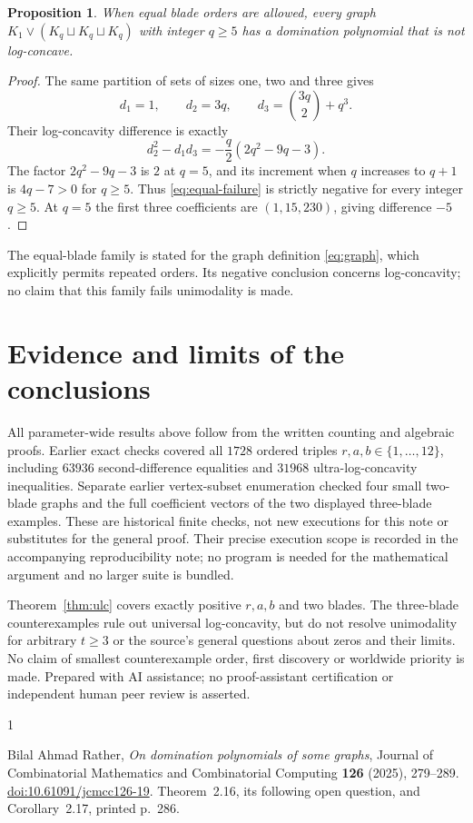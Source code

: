 \documentclass[11pt,a4paper]{article}
\newtheorem{proposition}{Proposition}
\begin{document}
\begin{proposition}\label{prop:equal}
When equal blade orders are allowed, every graph
$K_1\vee(K_q\sqcup K_q\sqcup K_q)$ with integer $q\ge5$ has a
domination polynomial that is not log-concave.
\end{proposition}
\begin{proof}
The same partition of sets of sizes one, two and three gives
\[
 d_1=1,\qquad d_2=3q,\qquad d_3=\binom{3q}{2}+q^3.
\]
Their log-concavity difference is exactly
\begin{equation}\label{eq:equal-failure}
 d_2^2-d_1d_3=-\frac q2(2q^2-9q-3).
\end{equation}
The factor $2q^2-9q-3$ is $2$ at $q=5$, and its increment when
$q$ increases to $q+1$ is $4q-7>0$ for $q\ge5$.
Thus \eqref{eq:equal-failure} is strictly negative for every
integer $q\ge5$. At $q=5$ the first three coefficients are
$(1,15,230)$, giving difference $-5$.
\end{proof}

The equal-blade family is stated for the graph definition
\eqref{eq:graph}, which explicitly permits repeated orders. Its
negative conclusion concerns log-concavity; no claim that this
family fails unimodality is made.

\section{Evidence and limits of the conclusions}
All parameter-wide results above follow from the written counting
and algebraic proofs. Earlier exact checks covered all $1728$
ordered triples $r,a,b\in\{1,\ldots,12\}$, including $63936$
second-difference equalities and $31968$ ultra-log-concavity
inequalities. Separate earlier vertex-subset enumeration checked
four small two-blade graphs and the full coefficient vectors of
the two displayed three-blade examples. These are historical
finite checks, not new executions for this note or substitutes
for the general proof. Their precise execution scope is recorded
in the accompanying reproducibility note; no program is needed
for the mathematical argument and no larger suite is bundled.

Theorem~\ref{thm:ulc} covers exactly positive $r,a,b$ and two blades.
The three-blade counterexamples rule out universal log-concavity,
but do not resolve unimodality for arbitrary $t\ge3$ or the
source's general questions about zeros and their limits. No claim
of smallest counterexample order, first discovery or worldwide
priority is made. Prepared with AI assistance; no proof-assistant
certification or independent human peer review is asserted.

\begin{thebibliography}{1}
\raggedright
{}
Bilal Ahmad Rather, \emph{On domination polynomials of some graphs},
Journal of Combinatorial Mathematics and Combinatorial Computing
\textbf{126} (2025), 279--289.
\href{https://doi.org/10.61091/jcmcc126-19}{doi:10.61091/jcmcc126-19}.
Theorem~2.16, its following open question, and Corollary~2.17,
printed p.~286.
\end{thebibliography}
\end{document}
